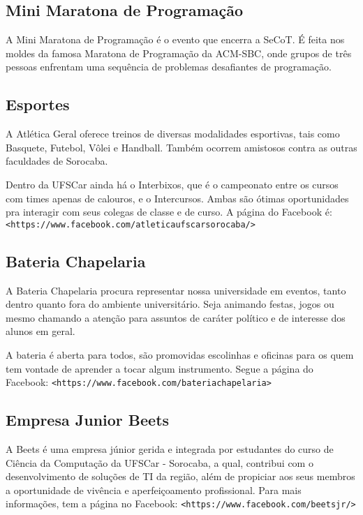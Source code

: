 \subsection{Mini Maratona de Programação}
A Mini Maratona de Programação é o evento que encerra a SeCoT. É feita nos moldes da famosa Maratona de Programação da ACM-SBC, onde grupos de três pessoas enfrentam uma sequência de problemas desafiantes de programação.

\subsection{Esportes}
A Atlética Geral oferece treinos de diversas modalidades esportivas, tais como Basquete, Futebol, Vôlei e Handball. Também ocorrem amistosos contra as outras faculdades de Sorocaba.

Dentro da UFSCar ainda há o Interbixos, que é o campeonato entre os cursos com times apenas de calouros, e o Intercursos. Ambas são ótimas oportunidades pra interagir com seus colegas de classe e de curso. A página do Facebook é: \texttt{<https://www.facebook.com/atleticaufscarsorocaba/>}

\subsection{Bateria Chapelaria}
A Bateria Chapelaria procura representar nossa universidade em eventos, tanto dentro quanto fora do ambiente universitário. Seja animando festas, jogos ou mesmo chamando a atenção para assuntos de caráter político e de interesse dos alunos em geral.

A bateria é aberta para todos, são promovidas escolinhas e oficinas para os quem tem vontade de aprender a tocar algum instrumento. Segue a página do Facebook: \newline \texttt{<https://www.facebook.com/bateriachapelaria>}

\subsection{Empresa Junior Beets}
A Beets é uma empresa júnior gerida e integrada por estudantes do curso de Ciência da Computação da UFSCar - Sorocaba, a qual, contribui com o desenvolvimento de soluções de TI da região, além de propiciar aos seus membros a oportunidade de vivência e aperfeiçoamento profissional. Para mais informações, tem a página no Facebook: \newline \texttt{<https://www.facebook.com/beetsjr/>}

